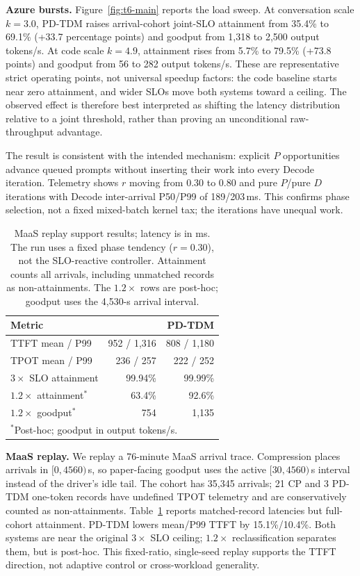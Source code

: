 \textbf{Azure bursts.}
Figure~\ref{fig:t6-main} reports the load sweep. At conversation scale
$k=3.0$, PD-TDM raises arrival-cohort joint-SLO attainment from 35.4\% to
69.1\% (+33.7 percentage points) and goodput from 1,318 to 2,500 output
tokens/s. At code scale $k=4.9$, attainment rises from 5.7\% to 79.5\%
(+73.8 points) and goodput from 56 to 282 output tokens/s. These are
representative strict
operating points, not universal speedup factors: the code baseline starts
near zero attainment, and wider SLOs move both systems toward a ceiling. The
observed effect is therefore best interpreted as shifting the latency
distribution relative to a joint threshold, rather than proving an unconditional
raw-throughput advantage.

The result is consistent with the intended mechanism: explicit $P$ opportunities
advance queued prompts without inserting their work into every Decode iteration.
Telemetry shows $r$ moving from 0.30 to 0.80 and pure $P$/pure $D$ iterations
with Decode inter-arrival P50/P99 of 189/203\,ms. This confirms phase selection,
not a fixed mixed-batch kernel tax; the iterations have unequal work.

\begin{table}[t]
\centering
\caption{MaaS replay support results; latency is in ms. The run uses a fixed
phase tendency ($r=0.30$), not the SLO-reactive controller. Attainment counts
all arrivals, including unmatched records as non-attainments. The $1.2\times$
rows are post-hoc; goodput uses the 4,530-s arrival interval.}
\label{tab:maas}
\small
\begin{tabular}{lrr}
\toprule
Metric & \baseline{} & PD-TDM \\
\midrule
TTFT mean / P99 & 952 / 1,316 & 808 / 1,180 \\
TPOT mean / P99 & 236 / 257 & 222 / 252 \\
$3\times$ SLO attainment & 99.94\% & 99.99\% \\
$1.2\times$ attainment$^{*}$ & 63.4\% & 92.6\% \\
$1.2\times$ goodput$^{*}$ & 754 & 1,135 \\
\bottomrule
\multicolumn{3}{l}{\footnotesize $^{*}$Post-hoc; goodput in output tokens/s.}
\end{tabular}
\end{table}

\textbf{MaaS replay.}
We replay a 76-minute MaaS arrival trace. Compression places arrivals in
$[0,4560)$\,s, so paper-facing goodput uses the active $[30,4560)$\,s interval
instead of the driver's idle tail. The cohort has 35,345 arrivals; 21 CP and 3
PD-TDM one-token records have undefined TPOT telemetry and are conservatively
counted as non-attainments. Table~\ref{tab:maas} reports matched-record
latencies but full-cohort attainment. PD-TDM lowers mean/P99 TTFT by
15.1\%/10.4\%. Both systems are near the original $3\times$ SLO ceiling;
$1.2\times$ reclassification separates them, but is post-hoc. This fixed-ratio,
single-seed replay supports the TTFT direction, not adaptive control or
cross-workload generality.

